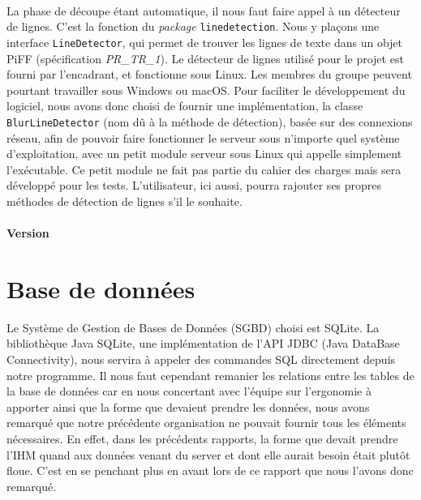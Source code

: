 \paragraph{}
La phase de découpe étant automatique, il nous faut faire appel à un détecteur de lignes. C'est la fonction du \textit{package} \texttt{linedetection}. Nous y plaçons une interface \texttt{LineDetector}, qui permet de trouver les lignes de texte dans un objet PiFF (spécification \textit{PR\_TR\_1}). Le détecteur de lignes utilisé pour le projet est fourni par l'encadrant, et fonctionne sous Linux. Les membres du groupe peuvent pourtant travailler sous Windows ou macOS. Pour faciliter le développement du logiciel, nous avons donc choisi de fournir une implémentation, la classe \texttt{BlurLineDetector} (nom dû à la méthode de détection), basée sur des connexions réseau, afin de pouvoir faire fonctionner le serveur sous n'importe quel système d'exploitation, avec un petit module serveur sous Linux qui appelle simplement l'exécutable. Ce petit module ne fait pas partie du cahier des charges mais sera développé pour les tests. L'utilisateur, ici aussi, pourra rajouter ses propres méthodes de détection de lignes s'il le souhaite.

\paragraph{Version}

\section{Base de données}

Le Système de Gestion de Bases de Données (SGBD) choisi est SQLite. La bibliothèque Java SQLite, une implémentation de l'API JDBC (Java DataBase Connectivity), nous servira à appeler des commandes SQL directement depuis notre programme.
Il nous faut cependant remanier les relations entre les tables de la base de données car en nous concertant avec l'équipe sur l'ergonomie à apporter ainsi que la forme que devaient prendre les données, nous avons remarqué que notre précédente organisation ne pouvait fournir tous les éléments nécessaires. En effet, dans les précédents rapports, la forme que devait prendre l'IHM quand aux données venant du server et dont elle aurait besoin était plutôt floue. C'est en se penchant plus en avant lors de ce rapport que nous l'avons donc remarqué.

